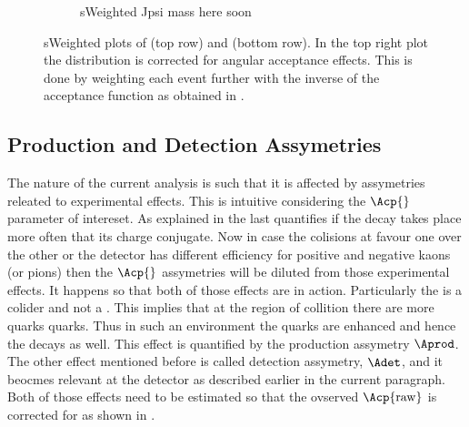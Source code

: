 \begin{figure}[h]
  \centering
  \begin{subfigure}{0.5\textwidth}
    \scalebox{0.65}{}
    \caption{}
    \label{mkpiPlot_raw}
  \end{subfigure}%
  \hfill%
  \begin{subfigure}{0.5\textwidth}
    \scalebox{0.65}{}
    \caption{}
    \label{mkpiPlot_eff}
  \end{subfigure}
  \begin{subfigure}{0.5\textwidth}
    \caption{\color{red} sWeighted Jpsi mass here soon}
    \label{jpsiPlot}
  \end{subfigure}
\caption{sWeighted plots of \mkpi(top row) and \jpsi (bottom row). In the top right plot the \mkpi distribution
         is corrected for angular acceptance effects. This is done by weighting each event further with the inverse 
         of the acceptance function as obtained in .}
\end{figure}

\subsection{Production and Detection Assymetries}
\label{experimentalAssym}
The nature of the current analysis is such that it is affected by assymetries releated to experimental effects.
This is intuitive considering the $\Acp{}$ parameter of intereset. As explained in 
the last quantifies if the decay \BsJpsiKst takes place more often that its charge conjugate. Now in case the
colisions at \lhc favour one over the other or the detector has different efficiency for positive and negative 
kaons (or pions) then the $\Acp{}$ assymetries will be diluted from those experimental effects. It happens so that
both of those effects are in action. Particularly the \lhc is a \proton\proton colider and not a \proton\antiproton .
This implies that at the region of collition there are more \bquark quarks \bquarkbar quarks. 
Thus in such an environment the \bquark quarks are enhanced and hence the \BsbarJpsiKst 
decays as well. This effect is quantified by the production assymetry $\Aprod$. The other effect mentioned before
is called detection assymetry, $\Adet$, and it beocmes relevant at the \lhcb detector as described earlier in the
current paragraph. Both of those effects need to be estimated so that the ovserved $\Acp{\rm raw}$ is corrected for
as shown in .

